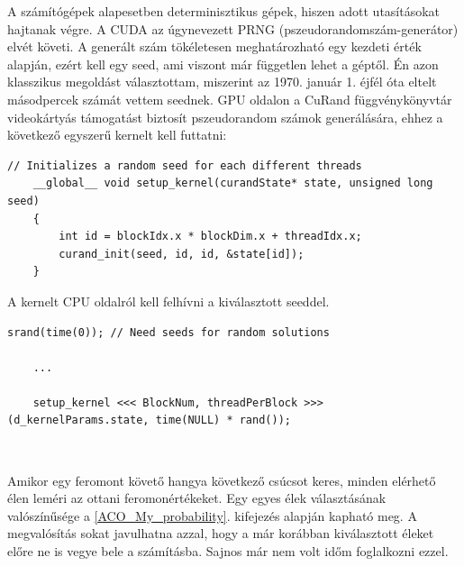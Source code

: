 A számítógépek alapesetben determinisztikus gépek, hiszen adott utasításokat hajtanak végre. A CUDA az úgynevezett PRNG (pszeudorandomszám-generátor) elvét követi. A generált szám tökéletesen meghatározható egy kezdeti érték alapján, ezért kell egy seed, ami viszont már független lehet a géptől. Én azon klasszikus megoldást választottam, miszerint az 1970. január 1. éjfél óta eltelt másodpercek számát vettem seednek.
GPU oldalon a CuRand függvénykönyvtár videokártyás támogatást biztosít pszeudorandom számok generálására, ehhez a következő egyszerű kernelt kell futtatni:

\begin{lstlisting}[style=CStyle]
	// Initializes a random seed for each different threads
	__global__ void setup_kernel(curandState* state, unsigned long seed)
	{
		int id = blockIdx.x * blockDim.x + threadIdx.x;
		curand_init(seed, id, id, &state[id]);
	}
\end{lstlisting}

A kernelt CPU oldalról kell felhívni a kiválasztott seeddel.

\begin{lstlisting}[style=CStyle]
	srand(time(0)); // Need seeds for random solutions
	
	...
	
	setup_kernel <<< BlockNum, threadPerBlock >>> (d_kernelParams.state, time(NULL) * rand());
\end{lstlisting}

\begin{lstlisting}[style=CStyle,showstringspaces=false]
	
\end{lstlisting}

Amikor egy feromont követő hangya következő csúcsot keres, minden elérhető élen leméri az ottani feromonértékeket. Egy egyes élek választásának valószínűsége a \ref{ACO_My_probability}. kifejezés alapján kapható meg. A megvalósítás sokat javulhatna azzal, hogy a már korábban kiválasztott éleket előre ne is vegye bele a számításba. Sajnos már nem volt időm foglalkozni ezzel.

